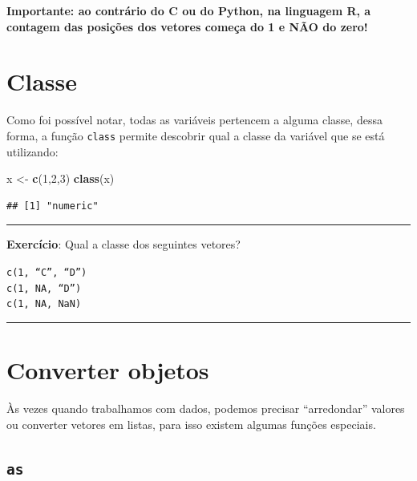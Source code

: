 \documentclass[]{book}
\newenvironment{Shaded}{\begin{snugshade}}{\end{snugshade}}
\newcommand{\KeywordTok}[1]{\textcolor[rgb]{0.13,0.29,0.53}{\textbf{#1}}}
\newcommand{\DecValTok}[1]{\textcolor[rgb]{0.00,0.00,0.81}{#1}}
\newcommand{\StringTok}[1]{\textcolor[rgb]{0.31,0.60,0.02}{#1}}
\newcommand{\NormalTok}[1]{#1}
\theoremstyle{definition}
\theoremstyle{definition}
\theoremstyle{definition}
\theoremstyle{remark}
\begin{document}
\textbf{Importante: ao contrário do C ou do Python, na linguagem R, a
contagem das posições dos vetores começa do 1 e NÃO do zero!}

\section{Classe}\label{classe}

Como foi possível notar, todas as variáveis pertencem a alguma classe,
dessa forma, a função \texttt{class} permite descobrir qual a classe da
variável que se está utilizando:

\begin{Shaded}
\begin{Highlighting}[]
\NormalTok{x <-}\StringTok{ }\KeywordTok{c}\NormalTok{(}\DecValTok{1}\NormalTok{,}\DecValTok{2}\NormalTok{,}\DecValTok{3}\NormalTok{)}
\KeywordTok{class}\NormalTok{(x)}
\end{Highlighting}
\end{Shaded}

\begin{verbatim}
## [1] "numeric"
\end{verbatim}

\begin{center}\rule{0.5\linewidth}{\linethickness}\end{center}

{\textbf{Exercício}: Qual a classe dos seguintes vetores?}

\texttt{c(1,\ “C”,\ “D”)}\\
\texttt{c(1,\ NA,\ “D”)}\\
\texttt{c(1,\ NA,\ NaN)}

\begin{center}\rule{0.5\linewidth}{\linethickness}\end{center}

\section{Converter objetos}\label{converter-objetos}

Às vezes quando trabalhamos com dados, podemos precisar ``arredondar''
valores ou converter vetores em listas, para isso existem algumas
funções especiais.

\subsection{\texorpdfstring{\texttt{as}}{as}}\label{as}
\end{document}
